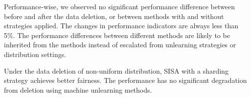Performance-wise, we observed no significant performance difference between before and after the data deletion, or between methods with and without strategies applied. The changes in performance indicators are always less than 5\%. The performance differences between different methods are likely to be inherited from the methods instead of escalated from unlearning strategies or distribution settings.

\begin{tcolorbox}
Under the data deletion of non-uniform distribution, SISA with a sharding strategy achieves better fairness. The performance has no significant degradation from deletion using machine unlearning methods.
\end{tcolorbox}

